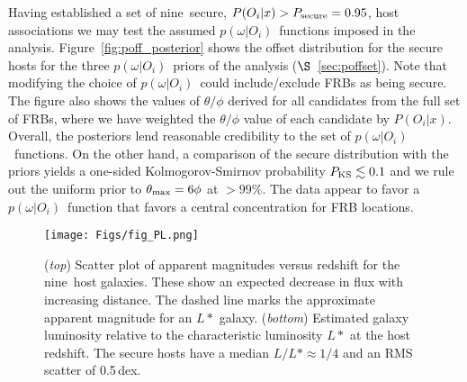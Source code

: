 \documentclass[twocolumn,linenumbers]{aastex63}
\newcommand{\mlstar}{L*}
\newcommand{\lstar}{$\mlstar$}
\newcommand{\nsecure}{nine}  %
\newcommand{\mhalflight}{\phi} %
\newcommand{\mthmax}{\theta_{\rm max}}  %
\newcommand{\mpoffset}{p(\omega|O_i)}  %
\newcommand{\poffset}{$\mpoffset$}
\newcommand{\mPOix}{P(O_i|x)}  %
\newcommand{\mPOsec}{P_{\rm secure}}  %
\newcommand{\POvsec}{0.95}  %
\begin{document}
Having established a set of \nsecure\ secure, 
$\mPOix > \mPOsec = \POvsec$, 
host associations we may 
test the assumed \poffset\ functions 
imposed in the analysis.
Figure~\ref{fig:poff_posterior} shows the offset distribution
for the secure hosts for the three \poffset\ priors
of the analysis ($\S$~\ref{sec:poffset}).
Note that modifying the choice of \poffset\ could include/exclude
FRBs as being secure.  The figure also shows the 
values of $\theta/\mhalflight$ derived for all candidates
from the full set of 
FRBs, where we have weighted the $\theta/\mhalflight$ value
of each candidate by $\mPOix$.  
Overall, the posteriors lend reasonable credibility to the 
set of \poffset\ functions.  On the other hand, a comparison
of the secure distribution with the priors yields 
a one-sided Kolmogorov-Smirnov probability 
$P_{\rm KS} \lesssim 0.1$ and we rule out the uniform prior
to $\mthmax = 6 \phi$ at $> 99\%$.  
The data appear to favor a \poffset\ function that favors
a central concentration for FRB locations.

\begin{figure}[!ht]
\centering
    \texttt{[image: Figs/fig\_PL.png]}
    \caption{
    ({\it top}) Scatter plot of apparent magnitudes versus redshift
    for the \nsecure\ host galaxies.  These show an expected
    decrease in flux with increasing distance.
    The dashed line marks the approximate apparent
    magnitude for an $L*$ galaxy.
    ({\it bottom}) Estimated galaxy luminosity relative to the
    characteristic luminosity $L*$ at the host redshift.
    The secure hosts have a median $L/L* \approx 1/4$ and
    an RMS scatter of 0.5\,dex.
    }
	\label{fig:PL}
\end{figure}

\end{document}
